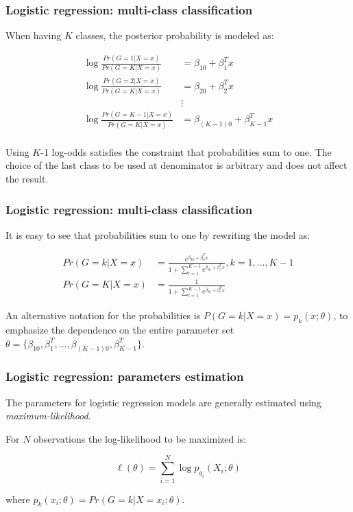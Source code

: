 \documentclass[notes]{beamer}          %
\begin{document}
\begin{frame}
\frametitle{Logistic regression: multi-class classification}

When having $K$ classes, the posterior probability is modeled as:

\begin{align*}
\log \frac{Pr(G=1 | X=x)}{Pr(G=K | X=x)} &= \beta_{10} + \beta_1^T x \\
\log \frac{Pr(G=2 | X=x)}{Pr(G=K | X=x)} &= \beta_{20} + \beta_2^T x \\
 & \vdots \\
\log \frac{Pr(G=K-1 | X=x)}{Pr(G=K | X=x)} &= \beta_{(K-1)0} + \beta_{K-1}^T x \\
\end{align*}

Using $K$-1 log-odds satisfies the constraint that probabilities sum to one. The choice of the last class to be used at denominator is arbitrary and does not affect the result.

\end{frame}

\begin{frame}
\frametitle{Logistic regression: multi-class classification}

It is easy to see that probabilities sum to one by rewriting the model as:

\begin{align*}
Pr(G=k | X=x) &= \frac{e^{\beta_{k0} + \beta_k^T x}}{1+\sum_{l=1}^{K-1} e^{\beta_{l0} + \beta_l^T x}}, k=1, \dots, K-1 \\
Pr(G=K | X=x) &= \frac{1}{1+\sum_{l=1}^{K-1} e^{\beta_{l0} + \beta_l^T x}}
\end{align*}

An alternative notation for the probabilities is $P(G=k|X=x) = p_k(x;\theta)$, to emphasize the dependence on the entire parameter set $\theta=  \{ \beta_{10}, \beta_1^T, \dots, \beta_{(K-1)0}, \beta_{K-1}^T \}$.

\end{frame}

\begin{frame}
\frametitle{Logistic regression: parameters estimation}

The parameters for logistic regression models are generally estimated using \textit{maximum-likelihood}.

\vspace{5mm} 

For $N$ observations the log-likelihood to be maximized is:

\begin{equation*}
    \ell(\theta) = \sum_{i=1}^N \log p_{g_i}(X_i; \theta)
\end{equation*}

where $p_k(x_i; \theta) = Pr(G=k|X=x_i; \theta)$.


\end{frame}
\end{document}
